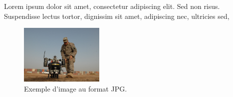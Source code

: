 Lorem ipsum dolor sit amet, consectetur adipiscing elit. Sed non risus. Suspendisse lectus tortor, dignissim sit amet, adipiscing nec, ultricies sed, 
\begin{figure}[htp]
  \centering
  \includegraphics[width=4cm]{images/bitmap_image}
  \caption{Exemple d'image au format JPG.}
  \label{fig:une-autre-image}
\end{figure}


